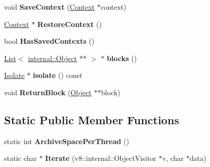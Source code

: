\begin{DoxyCompactItemize}
\item 
\hypertarget{classv8_1_1internal_1_1_handle_scope_implementer_aef55d684ac1e967647e3c7c7fe88934e}{}void {\bfseries Save\+Context} (\hyperlink{classv8_1_1internal_1_1_context}{Context} $\ast$context)\label{classv8_1_1internal_1_1_handle_scope_implementer_aef55d684ac1e967647e3c7c7fe88934e}

\item 
\hypertarget{classv8_1_1internal_1_1_handle_scope_implementer_abe96edb9ee340526135c7411675263ae}{}\hyperlink{classv8_1_1internal_1_1_context}{Context} $\ast$ {\bfseries Restore\+Context} ()\label{classv8_1_1internal_1_1_handle_scope_implementer_abe96edb9ee340526135c7411675263ae}

\item 
\hypertarget{classv8_1_1internal_1_1_handle_scope_implementer_a75f22aaa7cfac21893a225cf11e33a44}{}bool {\bfseries Has\+Saved\+Contexts} ()\label{classv8_1_1internal_1_1_handle_scope_implementer_a75f22aaa7cfac21893a225cf11e33a44}

\item 
\hypertarget{classv8_1_1internal_1_1_handle_scope_implementer_a7c913f3c0323d6328bca5bc6d91a5770}{}\hyperlink{classv8_1_1internal_1_1_list}{List}$<$ \hyperlink{classv8_1_1internal_1_1_object}{internal\+::\+Object} $\ast$$\ast$ $>$ $\ast$ {\bfseries blocks} ()\label{classv8_1_1internal_1_1_handle_scope_implementer_a7c913f3c0323d6328bca5bc6d91a5770}

\item 
\hypertarget{classv8_1_1internal_1_1_handle_scope_implementer_a57dc904b458b9086519bea355b812ee8}{}\hyperlink{classv8_1_1internal_1_1_isolate}{Isolate} $\ast$ {\bfseries isolate} () const \label{classv8_1_1internal_1_1_handle_scope_implementer_a57dc904b458b9086519bea355b812ee8}

\item 
\hypertarget{classv8_1_1internal_1_1_handle_scope_implementer_ae0b1e391b793af16c9738d6ff0c5973e}{}void {\bfseries Return\+Block} (\hyperlink{classv8_1_1internal_1_1_object}{Object} $\ast$$\ast$block)\label{classv8_1_1internal_1_1_handle_scope_implementer_ae0b1e391b793af16c9738d6ff0c5973e}

\end{DoxyCompactItemize}
\subsection*{Static Public Member Functions}
\begin{DoxyCompactItemize}
\item 
\hypertarget{classv8_1_1internal_1_1_handle_scope_implementer_ae1a88c356c5413fc94977f71ef5915e7}{}static int {\bfseries Archive\+Space\+Per\+Thread} ()\label{classv8_1_1internal_1_1_handle_scope_implementer_ae1a88c356c5413fc94977f71ef5915e7}

\item 
\hypertarget{classv8_1_1internal_1_1_handle_scope_implementer_a752b290babe1b9cb958f60bf84f6ad09}{}static char $\ast$ {\bfseries Iterate} (v8\+::internal\+::\+Object\+Visitor $\ast$v, char $\ast$data)\label{classv8_1_1internal_1_1_handle_scope_implementer_a752b290babe1b9cb958f60bf84f6ad09}

\end{DoxyCompactItemize}
